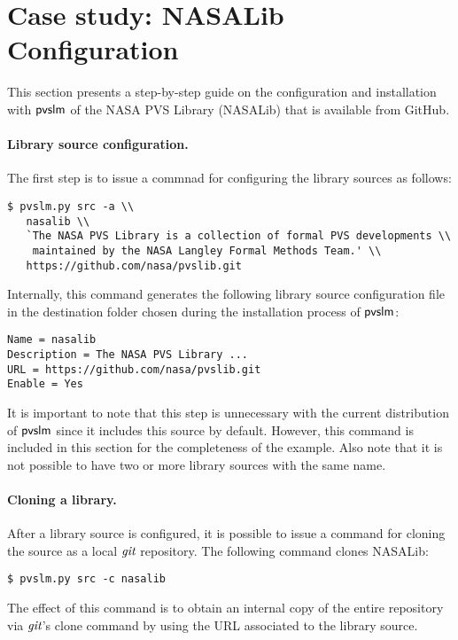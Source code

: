 \section{Case study: NASALib Configuration}
\label{sec.nasalib}

This section presents a step-by-step guide on the configuration and
installation with $\textsf{pvslm}$ of the NASA PVS Library (NASALib) that is
available from GitHub.

\paragraph{Library source configuration.}
The first step is to issue a commnad for configuring the library sources
as follows:
%
\begin{verbatim}
$ pvslm.py src -a \\
   nasalib \\
   `The NASA PVS Library is a collection of formal PVS developments \\
    maintained by the NASA Langley Formal Methods Team.' \\
   https://github.com/nasa/pvslib.git
\end{verbatim}
%
Internally, this command generates the following library source
configuration file in the destination folder chosen during the
installation process of $\textsf{pvslm}$:
%
\begin{verbatim}
Name = nasalib
Description = The NASA PVS Library ...
URL = https://github.com/nasa/pvslib.git
Enable = Yes
\end{verbatim}

It is important to note that this step is unnecessary with the current
distribution of $\textsf{pvslm}$ since it includes this source by default.
However, this command is included in this section for the completeness
of the example. Also note that it is not possible to have two or more
library sources with the same name.

\paragraph{Cloning a library.} After a library source
is configured, it is possible to issue a command for cloning the
source as a local $\textit{git}$ repository. The following command clones
NASALib:
%
\begin{verbatim}
$ pvslm.py src -c nasalib
\end{verbatim}
%
The effect of this command is to obtain an internal copy of the entire
repository via $\textit{git}$'s clone command by using the URL associated to
the library source.

